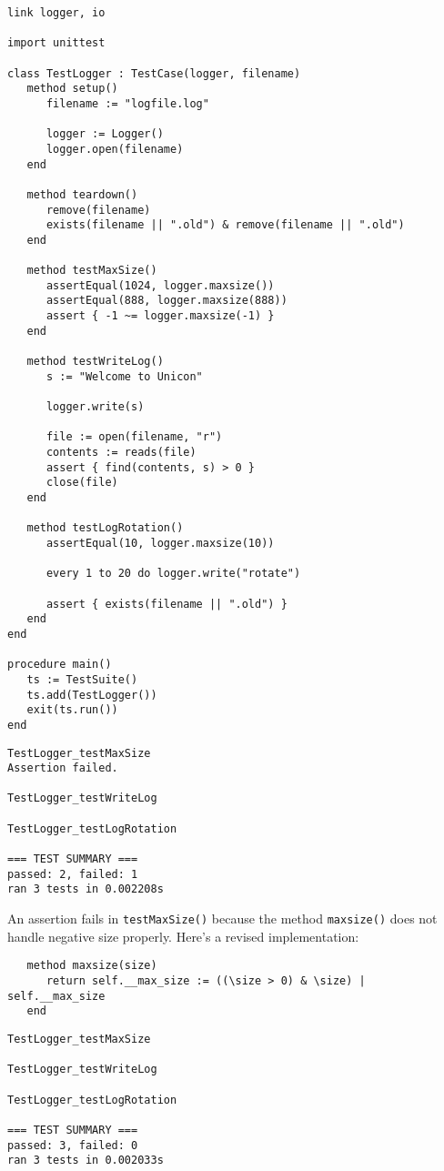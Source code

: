 \documentclass[letterpaper,12pt]{article}
\begin{document}
\bigskip{}
\begin{verbatim}
link logger, io

import unittest

class TestLogger : TestCase(logger, filename)
   method setup()
      filename := "logfile.log"
      
      logger := Logger()
      logger.open(filename)
   end

   method teardown()
      remove(filename)
      exists(filename || ".old") & remove(filename || ".old")
   end

   method testMaxSize()
      assertEqual(1024, logger.maxsize())
      assertEqual(888, logger.maxsize(888))
      assert { -1 ~= logger.maxsize(-1) }
   end

   method testWriteLog()
      s := "Welcome to Unicon"

      logger.write(s)

      file := open(filename, "r")
      contents := reads(file)
      assert { find(contents, s) > 0 }
      close(file)
   end

   method testLogRotation()
      assertEqual(10, logger.maxsize(10))

      every 1 to 20 do logger.write("rotate")

      assert { exists(filename || ".old") }
   end
end

procedure main()
   ts := TestSuite()
   ts.add(TestLogger())
   exit(ts.run())
end
\end{verbatim}

\bigskip{}
\begin{verbatim}
TestLogger_testMaxSize
Assertion failed.

TestLogger_testWriteLog

TestLogger_testLogRotation

=== TEST SUMMARY ===
passed: 2, failed: 1
ran 3 tests in 0.002208s
\end{verbatim}

\bigskip\noindent An assertion fails in \texttt{testMaxSize()} because the method \texttt{maxsize()} does not handle negative size properly. Here's a revised implementation:

\bigskip{}
\begin{verbatim}
   method maxsize(size)
      return self.__max_size := ((\size > 0) & \size) | self.__max_size
   end
\end{verbatim}

\bigskip{}
\begin{verbatim}
TestLogger_testMaxSize

TestLogger_testWriteLog

TestLogger_testLogRotation

=== TEST SUMMARY ===
passed: 3, failed: 0
ran 3 tests in 0.002033s
\end{verbatim}
\end{document}
